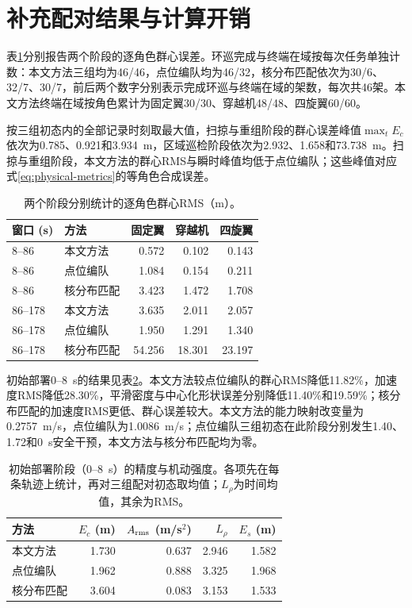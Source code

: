 \documentclass[UTF8,a4paper,11pt,fontset=none]{ctexart}
\begin{document}
\section{补充配对结果与计算开销}\label{app:supplement}
表\ref{tab:role-results}分别报告两个阶段的逐角色群心误差。环巡完成与终端在域按每次任务单独计数：本文方法三组均为46/46，点位编队均为46/32，核分布匹配依次为30/6、32/7、30/7，前后两个数字分别表示完成环巡与终端在域的架数，每次共46架。本文方法终端在域按角色累计为固定翼30/30、穿越机48/48、四旋翼60/60。

按三组初态内的全部记录时刻取最大值，扫掠与重组阶段的群心误差峰值$\max_t E_c$依次为0.785、0.921和3.934~m，区域巡检阶段依次为2.932、1.658和73.738~m。扫掠与重组阶段，本文方法的群心RMS与瞬时峰值均低于点位编队；这些峰值对应式\eqref{eq:physical-metrics}的等角色合成误差。

\begin{table}[htbp]\centering\small
\caption{两个阶段分别统计的逐角色群心RMS（m）。}\label{tab:role-results}
\begin{tabular}{llrrr}\toprule
窗口 (s) & 方法 & 固定翼 & 穿越机 & 四旋翼\\\midrule
8--86 & 本文方法 & 0.572 & 0.102 & 0.143\\
8--86 & 点位编队 & 1.084 & 0.154 & 0.211\\
8--86 & 核分布匹配 & 3.423 & 1.472 & 1.708\\
\midrule
86--178 & 本文方法 & 3.635 & 2.011 & 2.057\\
86--178 & 点位编队 & 1.950 & 1.291 & 1.340\\
86--178 & 核分布匹配 & 54.256 & 18.301 & 23.197\\
\bottomrule\end{tabular}\end{table}

初始部署0--8~s的结果见表\ref{tab:initial-deployment}。本文方法较点位编队的群心RMS降低11.82\%，加速度RMS降低28.30\%，平滑密度与中心化形状误差分别降低11.40\%和19.59\%；核分布匹配的加速度RMS更低、群心误差较大。本文方法的能力映射改变量为0.2757~m/s，点位编队为1.0086~m/s；点位编队三组初态在此阶段分别发生1.40、1.72和0~s安全干预，本文方法与核分布匹配均为零。

\begin{table}[htbp]\centering\small
\caption{初始部署阶段（0--8~s）的精度与机动强度。各项先在每条轨迹上统计，再对三组配对初态取均值；$L_\rho$为时间均值，其余为RMS。}\label{tab:initial-deployment}
\begin{tabular}{lrrrr}\toprule
方法 & $E_c$ (m) & $A_{\rm rms}$ (m/s$^2$) & $L_\rho$ & $E_s$ (m)\\\midrule
本文方法 & 1.730 & 0.637 & 2.946 & 1.582\\
点位编队 & 1.962 & 0.888 & 3.325 & 1.968\\
核分布匹配 & 3.604 & 0.083 & 3.153 & 1.533\\\bottomrule
\end{tabular}\end{table}
\end{document}
